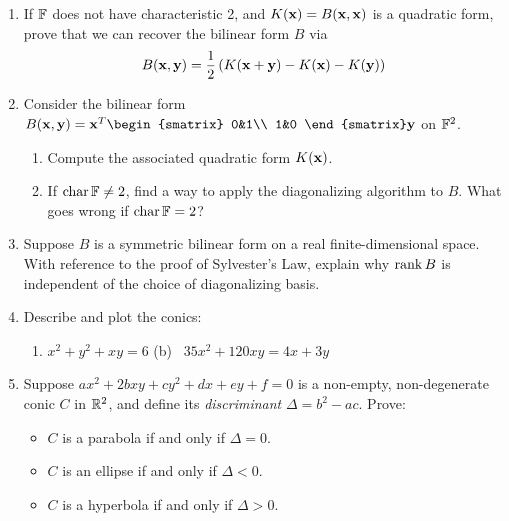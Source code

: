 \begin{exercises}
\begin{enumerate}
	  
	  \item If $\mathbb{F}$ does not have characteristic 2, and $K({\mathbf{x}})=B({\mathbf{x}},{\mathbf{x}})$ is a quadratic form, prove that we can recover the bilinear form $B$ via
		\[
			B({\mathbf{x}},{\mathbf{y}})=\frac 12\left(K({\mathbf{x}}+{\mathbf{y}})-K({\mathbf{x}})-K({\mathbf{y}})\right)
		\]
	  
	  
	  \item Consider the bilinear form $B(\vx,\vy)=\vx^T
	  \begin{smatrix}
	  	0&1\\
	  	1&0
	  \end{smatrix}
	  \vy$ on $\mathbb{F}^2$.
	  \begin{enumerate}
	    \item Compute the associated quadratic form $K({\mathbf{x}})$.
	  	\item If $\operatorname{char}\mathbb{F}\neq 2$, find a way to apply the diagonalizing algorithm to $B$. What goes wrong if $\operatorname{char}\mathbb{F}=2$?
	  \end{enumerate} 
	  
	  
	  \item\label{exs:sylvesterrank} Suppose $B$ is a symmetric bilinear form on a real finite-dimensional space. With reference to the proof of Sylvester's Law, explain why $\operatorname{rank} B$ is independent of the choice of diagonalizing basis.
	  
	  
	  \item Describe and plot the conics:
	  \begin{enumerate}
	    \item $x^2+y^2+xy=6$ \qquad\qquad
	    (b) \ $35x^2+120xy=4x+3y$
	  \end{enumerate}
	  
	  
		\item Suppose $ax^2+2bxy+cy^2+dx+ey+f=0$ is a non-empty, non-degenerate %
		conic $C$ in $\mathbb{R}^2$, and define its \emph{discriminant} $\Delta=b^2-ac$. Prove:
	  \begin{itemize}
	    \item $C$ is a parabola if and only if $\Delta=0$.
	    \item $C$ is an ellipse if and only if $\Delta<0$.
	    \item $C$ is a hyperbola if and only if $\Delta>0$.
	  \end{itemize}
	\end{enumerate}
\end{exercises}

  
